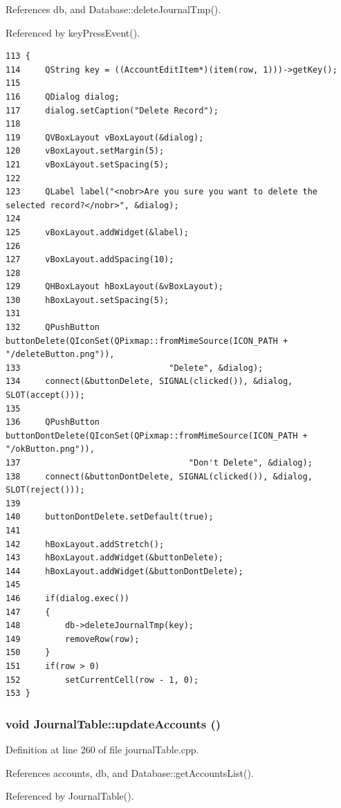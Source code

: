 References db, and Database::delete\-Journal\-Tmp().

Referenced by key\-Press\-Event().

\footnotesize\begin{verbatim}113 {
114     QString key = ((AccountEditItem*)(item(row, 1)))->getKey();
115     
116     QDialog dialog;
117     dialog.setCaption("Delete Record");
118 
119     QVBoxLayout vBoxLayout(&dialog);
120     vBoxLayout.setMargin(5);
121     vBoxLayout.setSpacing(5);
122 
123     QLabel label("<nobr>Are you sure you want to delete the selected record?</nobr>", &dialog);
124 
125     vBoxLayout.addWidget(&label);
126 
127     vBoxLayout.addSpacing(10);
128 
129     QHBoxLayout hBoxLayout(&vBoxLayout);
130     hBoxLayout.setSpacing(5);
131 
132     QPushButton buttonDelete(QIconSet(QPixmap::fromMimeSource(ICON_PATH + "/deleteButton.png")),
133                              "Delete", &dialog);
134     connect(&buttonDelete, SIGNAL(clicked()), &dialog, SLOT(accept()));
135 
136     QPushButton buttonDontDelete(QIconSet(QPixmap::fromMimeSource(ICON_PATH + "/okButton.png")),
137                                  "Don't Delete", &dialog);
138     connect(&buttonDontDelete, SIGNAL(clicked()), &dialog, SLOT(reject()));
139 
140     buttonDontDelete.setDefault(true);
141 
142     hBoxLayout.addStretch();
143     hBoxLayout.addWidget(&buttonDelete);
144     hBoxLayout.addWidget(&buttonDontDelete);
145 
146     if(dialog.exec())
147     {
148         db->deleteJournalTmp(key);
149         removeRow(row);
150     }
151     if(row > 0)
152         setCurrentCell(row - 1, 0);
153 }
\end{verbatim}\normalsize 


\hypertarget{classJournalTable_k2}{
\subsubsection[updateAccounts]{\setlength{\rightskip}{0pt plus 5cm}void Journal\-Table::update\-Accounts ()}}
\label{classJournalTable_k2}


Definition at line 260 of file journal\-Table.cpp.

References accounts, db, and Database::get\-Accounts\-List().

Referenced by Journal\-Table().

